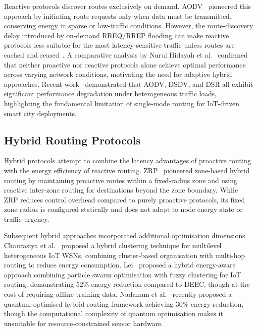 \documentclass[12pt]{article}
\begin{document}
Reactive protocols discover routes exclusively on demand.
AODV~\cite{perkins1999} pioneered this approach by initiating route
requests only when data must be transmitted, conserving energy in
sparse or low-traffic conditions. However, the route-discovery delay introduced by on-demand RREQ/RREP flooding
can make reactive protocols less suitable for the most latency-sensitive
traffic unless routes are cached and reused~\cite{selim_manet_2025}. A comparative analysis by
Nurul Hidayah et al.~\cite{nurul_hidayah_ahmad_zukri_comparative_2025}
confirmed that neither proactive nor reactive protocols alone achieve
optimal performance across varying network conditions, motivating the
need for adaptive hybrid approaches. Recent work~\cite{karthikeyan_optimizing_2025}
demonstrated that AODV, DSDV, and DSR all exhibit significant
performance degradation under heterogeneous traffic loads, highlighting
the fundamental limitation of single-mode routing for IoT-driven
smart city deployments.

\subsection{Hybrid Routing Protocols}

Hybrid protocols attempt to combine the latency advantages of
proactive routing with the energy efficiency of reactive routing.
ZRP~\cite{haas2001} pioneered zone-based hybrid routing by maintaining
proactive routes within a fixed-radius zone and using reactive
inter-zone routing for destinations beyond the zone boundary. While
ZRP reduces control overhead compared to purely proactive protocols,
its fixed zone radius is configured statically and does not adapt to
node energy state or traffic urgency.

Subsequent hybrid approaches incorporated additional optimisation
dimensions. Chaurasiya et al.~\cite{chaurasiya_energy-efficient_2023}
proposed a hybrid clustering technique for multilevel heterogeneous
IoT WSNs, combining cluster-based organisation with multi-hop routing
to reduce energy consumption. Lei~\cite{lei_energy-aware_2024}
proposed a hybrid energy-aware approach combining particle swarm
optimisation with fuzzy clustering for IoT routing, demonstrating
52\% energy reduction compared to DEEC, though at the cost of
requiring offline training data. Nadanam
et al.~\cite{nadanam_innovative_2026} recently proposed a
quantum-optimised hybrid routing framework achieving 30\% energy
reduction, though the computational complexity of quantum optimisation
makes it unsuitable for resource-constrained sensor hardware.
\end{document}
